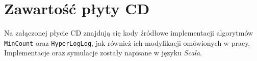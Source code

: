 \chapter{Zawartość płyty CD}
\thispagestyle{chapterBeginStyle}
\label{plytaCD}

Na załączonej płycie CD znajdują się kody źródłowe implementacji algorytmów \texttt{MinCount} oraz \texttt{HyperLogLog}, jak również
ich modyfikacji omówionych w pracy. Implementacje oraz symulacje zostały napisane w języku \textit{Scala}. 